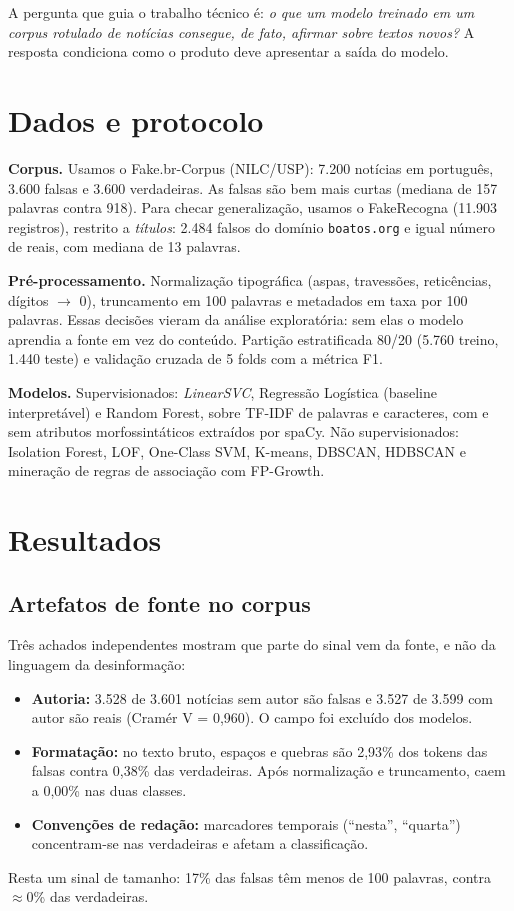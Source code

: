 \documentclass[brazilian,11pt,a4paper]{article}
\begin{document}
A pergunta que guia o trabalho técnico é: \emph{o que um modelo treinado em um corpus rotulado de notícias consegue, de fato, afirmar sobre textos novos?} A resposta condiciona como o produto deve apresentar a saída do modelo.

\section{Dados e protocolo}

\textbf{Corpus.} Usamos o Fake.br-Corpus (NILC/USP): 7.200 notícias em português, 3.600 falsas e 3.600 verdadeiras. As falsas são bem mais curtas (mediana de 157 palavras contra 918). Para checar generalização, usamos o FakeRecogna (11.903 registros), restrito a \emph{títulos}: 2.484 falsos do domínio \texttt{boatos.org} e igual número de reais, com mediana de 13 palavras.

\textbf{Pré-processamento.} Normalização tipográfica (aspas, travessões, reticências, dígitos $\to$ 0), truncamento em 100 palavras e metadados em taxa por 100 palavras. Essas decisões vieram da análise exploratória: sem elas o modelo aprendia a fonte em vez do conteúdo. Partição estratificada 80/20 (5.760 treino, 1.440 teste) e validação cruzada de 5 folds com a métrica F1.

\textbf{Modelos.} Supervisionados: \textit{LinearSVC}, Regressão Logística (baseline interpretável) e Random Forest, sobre TF-IDF de palavras e caracteres, com e sem atributos morfossintáticos extraídos por spaCy. Não supervisionados: Isolation Forest, LOF, One-Class SVM, K-means, DBSCAN, HDBSCAN e mineração de regras de associação com FP-Growth.

\section{Resultados}

\subsection{Artefatos de fonte no corpus}

Três achados independentes mostram que parte do sinal vem da fonte, e não da linguagem da desinformação:
\begin{itemize}
  \item \textbf{Autoria:} 3.528 de 3.601 notícias sem autor são falsas e 3.527 de 3.599 com autor são reais (Cramér V = 0,960). O campo foi excluído dos modelos.
  \item \textbf{Formatação:} no texto bruto, espaços e quebras são 2,93\% dos tokens das falsas contra 0,38\% das verdadeiras. Após normalização e truncamento, caem a 0,00\% nas duas classes.
  \item \textbf{Convenções de redação:} marcadores temporais (``nesta'', ``quarta'') concentram-se nas verdadeiras e afetam a classificação.
\end{itemize}
Resta um sinal de tamanho: 17\% das falsas têm menos de 100 palavras, contra $\approx$0\% das verdadeiras.
\end{document}
